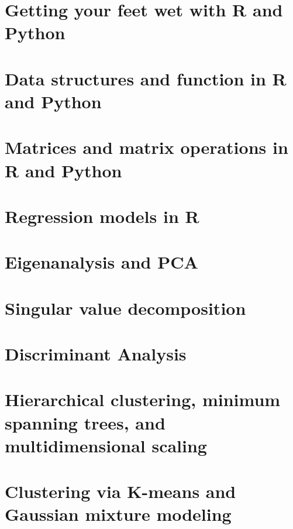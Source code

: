 \documentclass[extrafontsizes]{memoir}
\begin{document}
\pagestyle{empty} 
\mytitlepage

\newpage

\tableofcontents


\chapter{Getting your feet wet with R and Python}


\chapter{Data structures and function in R and Python}


\chapter{Matrices and matrix operations in R and Python}


\chapter{Regression models in R}


\chapter{Eigenanalysis and PCA}


\chapter{Singular value decomposition}


\chapter{Discriminant Analysis}



\chapter{Hierarchical clustering, minimum spanning trees, and multidimensional scaling}


\chapter{Clustering via K-means and Gaussian mixture modeling}

\end{document}
